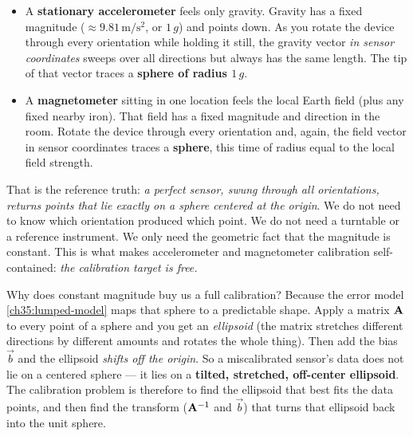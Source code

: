 \begin{itemize}
\item A \textbf{stationary accelerometer} feels only gravity. Gravity has a fixed
magnitude ($\approx 9.81\,\mathrm{m/s^2}$, or $1\,g$) and points down. As you
rotate the device through every orientation while holding it still, the gravity
vector \emph{in sensor coordinates} sweeps over all directions but always has the
same length. The tip of that vector traces a \textbf{sphere of radius $1\,g$}.
\item A \textbf{magnetometer} sitting in one location feels the local Earth field
(plus any fixed nearby iron). That field has a fixed magnitude and direction in
the room. Rotate the device through every orientation and, again, the field
vector in sensor coordinates traces a \textbf{sphere}, this time of radius equal
to the local field strength.
\end{itemize}

That is the reference truth: \emph{a perfect sensor, swung through all
orientations, returns points that lie exactly on a sphere centered at the
origin}. We do not need to know which orientation produced which point. We do not
need a turntable or a reference instrument. We only need the geometric fact that
the magnitude is constant. This is what makes accelerometer and magnetometer
calibration self-contained: \emph{the calibration target is free.}

\begin{whybox}
Why does constant magnitude buy us a full calibration? Because the error model
\eqref{ch35:lumped-model} maps that sphere to a predictable shape. Apply a matrix
$\mathbf{A}$ to every point of a sphere and you get an \emph{ellipsoid} (the matrix
stretches different directions by different amounts and rotates the whole thing).
Then add the bias $\vec{b}$ and the ellipsoid \emph{shifts off the origin}. So a
miscalibrated sensor's data does not lie on a centered sphere --- it lies on a
\textbf{tilted, stretched, off-center ellipsoid}. The calibration problem is therefore to find the ellipsoid that best fits the data points, and then find the transform ($\mathbf{A}^{-1}$ and $\vec{b}$) that turns that ellipsoid back into the unit sphere.
\end{whybox}

